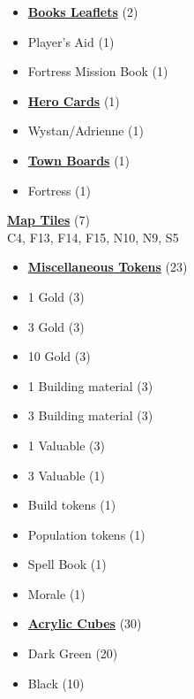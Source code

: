 
\begin{multicols}{3}

\small

\begin{itemize}[leftmargin=0pt, label={}, noitemsep, noitemsep]
  \item \textbf{\underline{Books Leaflets}} (2)
  \item Player's Aid (1)
  \item Fortress Mission Book (1)
\end{itemize}

\begin{itemize}[leftmargin=0pt, label={}, noitemsep, noitemsep]
  \item \textbf{\underline{Hero Cards}} (1)
  \item Wystan/Adrienne (1)
\end{itemize}

\begin{itemize}[leftmargin=0pt, label={}, noitemsep, noitemsep]
  \item \textbf{\underline{Town Boards}} (1)
  \item Fortress (1)
\end{itemize}

\textbf{\underline{Map Tiles}} (7)\\
C4, F13, F14, F15, N10, N9, S5

\begin{itemize}[leftmargin=0pt, label={}, noitemsep, noitemsep]
  \item \textbf{\underline{Miscellaneous Tokens}} (23)
  \item 1 Gold (3)
  \item 3 Gold (3)
  \item 10 Gold (3)
  \item 1 Building material (3)
  \item 3 Building material (3)
  \item 1 Valuable (3)
  \item 3 Valuable (1)
  \item Build tokens (1)
  \item Population tokens (1)
  \item Spell Book (1)
  \item Morale (1)
\end{itemize}

\begin{itemize}[leftmargin=0pt, label={}, noitemsep, noitemsep]
  \item \textbf{\underline{Acrylic Cubes}} (30)
  \item Dark Green (20)
  \item Black (10)
\end{itemize}


\end{multicols}
